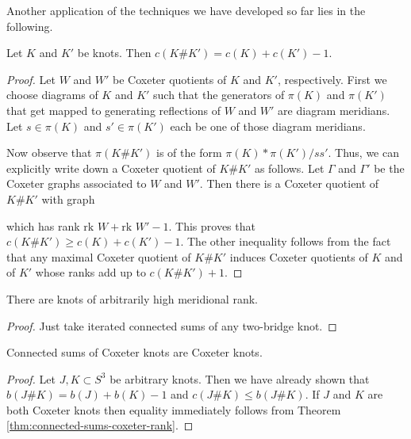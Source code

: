 \documentclass[main.tex]{subfiles}
\begin{document}
Another application of the techniques we have developed so far lies in the following.

\begin{theorem}\label{thm:connected-sums-coxeter-rank}
Let $K$ and $K'$ be knots. Then $c (K\#K') = c (K) + c (K') - 1$.
\end{theorem}

\begin{proof}
Let $W$ and $W'$ be Coxeter quotients of $K$ and $K'$, respectively. First we choose diagrams of $K$ and $K'$ such that the generators of $\pi(K)$ and $\pi(K')$ that get mapped to generating reflections of $W$ and $W'$ are diagram meridians. Let $s \in \pi(K)$ and $s' \in \pi(K')$ each be one of those diagram meridians.

Now observe that $\pi(K\#K')$ is of the form $\pi(K) * \pi(K') / ss'$. Thus, we can explicitly write down a Coxeter quotient of $K\#K'$ as follows. Let $\Gamma$ and $\Gamma'$ be the Coxeter graphs associated to $W$ and $W'$. Then there is a Coxeter quotient of $K\#K'$ with graph
\begin{center}
\end{center}
which has rank $\text{rk } W + \text{rk } W' - 1$. This proves that $c(K\#K') \geq c(K) + c(K') -1$. The other inequality follows from the fact that any maximal Coxeter quotient of $K\#K'$ induces Coxeter quotients of $K$ and of $K'$ whose ranks add up to $c(K\#K') + 1$.
\end{proof}

\begin{corollary}
There are knots of arbitrarily high meridional rank.
\end{corollary}

\begin{proof}
Just take iterated connected sums of any two-bridge knot.
\end{proof}

\begin{corollary}
Connected sums of Coxeter knots are Coxeter knots.
\end{corollary}

\begin{proof}
Let $J, K \subset S^3$ be arbitrary knots. Then we have already shown that $b(J\#K) = b(J) + b(K) - 1$ and $c (J\#K) \leq b(J\#K)$. If $J$ and $K$ are both Coxeter knots then equality immediately follows from Theorem \ref{thm:connected-sums-coxeter-rank}.
\end{proof}
\end{document}

